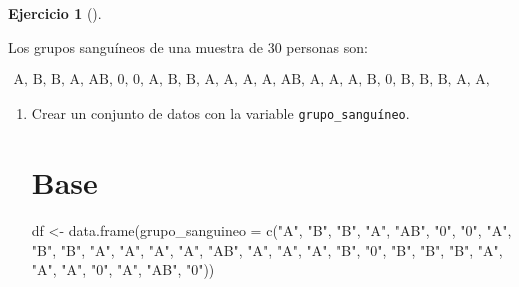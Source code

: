 \documentclass[
  a4paper,
]{scrreport}
\newenvironment{Shaded}{\begin{snugshade}}{\end{snugshade}}
\newcommand{\AttributeTok}[1]{\textcolor[rgb]{0.40,0.45,0.13}{#1}}
\newcommand{\FunctionTok}[1]{\textcolor[rgb]{0.28,0.35,0.67}{#1}}
\newcommand{\NormalTok}[1]{\textcolor[rgb]{0.00,0.23,0.31}{#1}}
\newcommand{\OtherTok}[1]{\textcolor[rgb]{0.00,0.23,0.31}{#1}}
\newcommand{\StringTok}[1]{\textcolor[rgb]{0.13,0.47,0.30}{#1}}
\theoremstyle{definition}
\newtheorem{exercise}{Ejercicio}[chapter]
\theoremstyle{remark}
\begin{document}
\begin{exercise}[]\protect\hypertarget{exr-frecuencias-graficos-grupo-sanguineo}{}\label{exr-frecuencias-graficos-grupo-sanguineo}

Los grupos sanguíneos de una muestra de 30 personas son:

\[
\begin{array}{c}
\mbox{A, B, B, A, AB, 0, 0, A, B, B, A, A, A, A, AB, A, A, A, B, 0, B, B, B, A, A, A, 0, A, AB, 0}
\end{array}
\]

\begin{enumerate}
\def\labelenumi{\alph{enumi}.}
\item
  Crear un conjunto de datos con la variable \texttt{grupo\_sanguíneo}.

  \begin{tcolorbox}[enhanced jigsaw, colframe=quarto-callout-tip-color-frame, toprule=.15mm, bottomtitle=1mm, breakable, opacitybacktitle=0.6, toptitle=1mm, colback=white, bottomrule=.15mm, title=\textcolor{quarto-callout-tip-color}{\faLightbulb}\hspace{0.5em}{Solución}, arc=.35mm, left=2mm, titlerule=0mm, rightrule=.15mm, coltitle=black, leftrule=.75mm, opacityback=0, colbacktitle=quarto-callout-tip-color!10!white]

  \section{Base}

\begin{Shaded}
\begin{Highlighting}[]
\NormalTok{df }\OtherTok{\textless{}{-}} \FunctionTok{data.frame}\NormalTok{(}\AttributeTok{grupo\_sanguineo =} \FunctionTok{c}\NormalTok{(}\StringTok{"A"}\NormalTok{, }\StringTok{"B"}\NormalTok{, }\StringTok{"B"}\NormalTok{, }\StringTok{"A"}\NormalTok{, }\StringTok{"AB"}\NormalTok{, }\StringTok{"0"}\NormalTok{, }\StringTok{"0"}\NormalTok{, }\StringTok{"A"}\NormalTok{, }\StringTok{"B"}\NormalTok{, }\StringTok{"B"}\NormalTok{, }\StringTok{"A"}\NormalTok{, }\StringTok{"A"}\NormalTok{, }\StringTok{"A"}\NormalTok{, }\StringTok{"A"}\NormalTok{, }\StringTok{"AB"}\NormalTok{, }\StringTok{"A"}\NormalTok{, }\StringTok{"A"}\NormalTok{, }\StringTok{"A"}\NormalTok{, }\StringTok{"B"}\NormalTok{, }\StringTok{"0"}\NormalTok{, }\StringTok{"B"}\NormalTok{, }\StringTok{"B"}\NormalTok{, }\StringTok{"B"}\NormalTok{, }\StringTok{"A"}\NormalTok{, }\StringTok{"A"}\NormalTok{, }\StringTok{"A"}\NormalTok{, }\StringTok{"0"}\NormalTok{, }\StringTok{"A"}\NormalTok{, }\StringTok{"AB"}\NormalTok{, }\StringTok{"0"}\NormalTok{))}
\end{Highlighting}
\end{Shaded}


\end{tcolorbox}
\end{enumerate}
\end{exercise}
\end{document}
